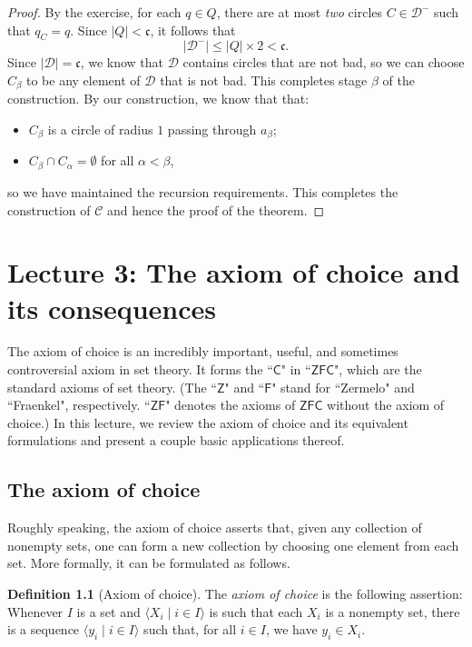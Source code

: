 \documentclass[a4paper]{memoir}
\theoremstyle{definition}
\newtheorem{definition}[theorem]{Definition}
\newcommand{\mc}{\mathcal}
\begin{document}
\begin{proof}
  By the exercise, for each $q \in Q$, there are at most \emph{two} circles $C \in \mc{D}^-$ such 
  that $q_C = q$. Since $|Q| < \mathfrak{c}$, it follows that 
  \[
    |\mc{D}^-| \leq |Q| \times 2 < \mathfrak{c}.
  \]
  Since $|\mc{D}| = \mathfrak{c}$, we know that $\mc{D}$ contains circles that are not bad, so 
  we can choose $C_\beta$ to be any element of $\mc{D}$ that is not bad. This completes stage 
  $\beta$ of the construction. By our construction, we know that
  that:
  \begin{itemize}
    \item $C_\beta$ is a circle of radius $1$ passing through $a_\beta$;
    \item $C_\beta \cap C_\alpha = \emptyset$ for all $\alpha < \beta$,
  \end{itemize}
  so we have maintained the recursion requirements. This completes the construction of 
  $\mc{C}$ and hence the proof of the theorem.
\end{proof}

\chapter{Lecture 3: The axiom of choice and its consequences}

The axiom of choice is an incredibly important, useful, and sometimes controversial 
axiom in set theory. It forms the ``$\mathsf{C}$" in ``$\mathsf{ZFC}$", which are the 
standard axioms of set theory. (The ``$\mathsf{Z}$" and  ``$\mathsf{F}$" stand for ``Zermelo" 
and ``Fraenkel", respectively. ``$\mathsf{ZF}$" denotes the axioms of $\mathsf{ZFC}$ without 
the axiom of choice.) In this lecture, we review the axiom of choice and its equivalent 
formulations and present a couple basic applications thereof.

\section{The axiom of choice}

Roughly speaking, the axiom of choice asserts that, given any collection of nonempty sets, 
one can form a new collection by choosing one element from each set. More formally, it can be 
formulated as follows.

\begin{definition}[Axiom of choice]
  The \emph{axiom of choice} is the following assertion: Whenever $I$ is a set and 
  $\langle X_i \mid i \in I \rangle$ is such that each $X_i$ is a nonempty set, there is 
  a sequence $\langle y_i \mid i \in I \rangle$ such that, for all $i \in I$, we have 
  $y_i \in X_i$.
\end{definition}
\end{document}
